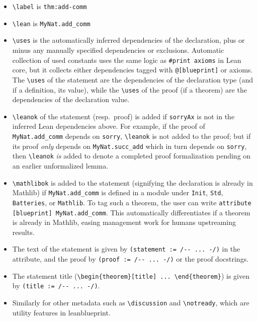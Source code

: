 \documentclass{article}
\newcommand{\leanblueprint}{leanblueprint\xspace}
\newcommand\latexcode{\lstinline[language={[latex]tex},keywordstyle=\ttfamily\color{black}]}
\newcommand\leancode{\lstinline[language=lean]}
\begin{document}
\begin{itemize}
\item \latexcode|\label| is \latexcode{thm:add-comm}
\item \latexcode|\lean| is \leancode{MyNat.add_comm}
\item \latexcode|\uses| is the automatically inferred dependencies of the declaration, plus or minus any manually specified dependencies or exclusions. Automatic collection of used constants uses the same logic as \leancode{#print axioms} in Lean core, but it collects either dependencies tagged with \leancode{@[blueprint]} or axioms. The \latexcode|\uses| of the statement are the dependencies of the declaration type (and if a definition, its value), while the \latexcode|\uses| of the proof (if a theorem) are the dependencies of the declaration value.
\item \latexcode|\leanok| of the statement (resp.\ proof) is added if \leancode{sorryAx} is not in the inferred Lean dependencies above. For example, if the proof of \leancode{MyNat.add_comm} depends on \leancode{sorry}, \latexcode|\leanok| is not added to the proof; but if its proof \emph{only} depends on \leancode{MyNat.succ_add} which in turn depends on \leancode{sorry}, then \latexcode|\leanok| \emph{is} added to denote a completed proof formalization pending on an earlier unformalized lemma.
\item \latexcode|\mathlibok| is added to the statement (signifying the declaration is already in Mathlib) if \leancode{MyNat.add_comm} is defined in a module under \leancode{Init}, \leancode{Std}, \leancode{Batteries}, or \leancode{Mathlib}. To tag such a theorem, the user can write \leancode{attribute [blueprint] MyNat.add_comm}. This automatically differentiates if a theorem is already in Mathlib, easing management work for humans upstreaming results.
\item The text of the statement is given by \leancode{(statement := /-- ... -/)} in the attribute, and the proof by \leancode{(proof := /-- ... -/)} or the proof docstrings.
\item The statement title (\latexcode|\begin{theorem}[title] ... \end{theorem}|) is given by \leancode{(title := /-- ... -/)}.
\item Similarly for other metadata such as \latexcode{\discussion} and \latexcode{\notready}, which are utility features in \leanblueprint.
\end{itemize}
\end{document}
